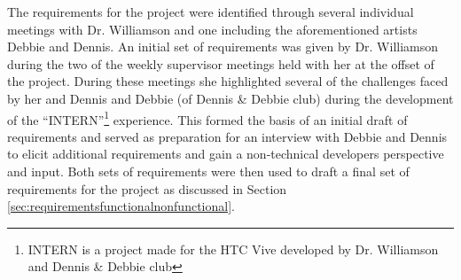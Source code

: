\documentclass{l4proj}
\begin{document}
The requirements for the project were identified through several individual meetings with Dr. Williamson and one including the aforementioned artists Debbie and Dennis. An initial set of requirements was given by Dr. Williamson during the two of the weekly supervisor meetings held with her at the offset of the project. During these meetings she highlighted several of the challenges faced by her and Dennis and Debbie (of Dennis \& Debbie club) during the development of the ``INTERN''\footnote{INTERN is a project made for the HTC Vive developed by Dr. Williamson and Dennis \& Debbie club} experience. This formed the basis of an initial draft of requirements and served as preparation for an interview with Debbie and Dennis to elicit additional requirements and gain a non-technical developers perspective and input. Both sets of requirements were then used to draft a final set of requirements for the project as discussed in Section \ref{sec:requirementsfunctionalnonfunctional}.
\end{document}
